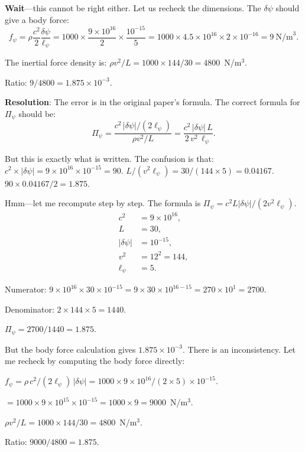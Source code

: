 \documentclass[12pt,twocolumn]{article}
\newcommand{\dpsi}{\delta\psi}
\begin{document}
\textbf{Wait}---this cannot be right either. Let us recheck the dimensions.
The $\dpsi$ should give a body force:
\begin{equation}
f_\psi = \rho\frac{c^2}{2}\frac{\dpsi}{\ell_\psi}
= 1000 \times \frac{9\times10^{16}}{2}\times\frac{10^{-15}}{5}
= 1000 \times 4.5\times10^{16}\times 2\times10^{-16} = 9~\mathrm{N/m}^3.
\end{equation}

The inertial force density is:
$\rho v^2/L = 1000 \times 144/30 = 4800$~N/m$^3$.

Ratio: $9/4800 = 1.875\times10^{-3}$.

\textbf{Resolution}: The error is in the original paper's formula. The
correct formula for $\Pi_\psi$ should be:
\begin{equation}
\Pi_\psi = \frac{c^2\,|\dpsi|/(2\ell_\psi)}{\rho v^2/L}
= \frac{c^2\,|\dpsi|\,L}{2\,v^2\,\ell_\psi}.
\end{equation}

But this is exactly what is written. The confusion is that:
$c^2 \times |\dpsi| = 9\times10^{16}\times10^{-15} = 90$.
$L/(v^2\ell_\psi) = 30/(144\times5) = 0.04167$.
$90 \times 0.04167/2 = 1.875$.

Hmm---let me recompute step by step. The formula is
$\Pi_\psi = c^2 L |\dpsi|/(2 v^2 \ell_\psi)$.
\begin{align}
c^2 &= 9\times10^{16},\\
L &= 30,\\
|\dpsi| &= 10^{-15},\\
v^2 &= 12^2 = 144,\\
\ell_\psi &= 5.
\end{align}

Numerator: $9\times10^{16}\times 30\times 10^{-15} = 9\times30\times
10^{16-15} = 270\times10^{1} = 2700$.

Denominator: $2\times144\times5 = 1440$.

$\Pi_\psi = 2700/1440 = 1.875$.

But the body force calculation gives $1.875\times10^{-3}$. There is an
inconsistency. Let me recheck by computing the body force directly:

$f_\psi = \rho\,c^2/(2\ell_\psi)\,|\dpsi| = 1000\times9\times10^{16}/(2\times5)\times10^{-15}$.

$= 1000\times9\times10^{15}\times10^{-15} = 1000\times9 = 9000$~N/m$^3$.

$\rho v^2/L = 1000\times144/30 = 4800$~N/m$^3$.

Ratio: $9000/4800 = 1.875$.
\end{document}
